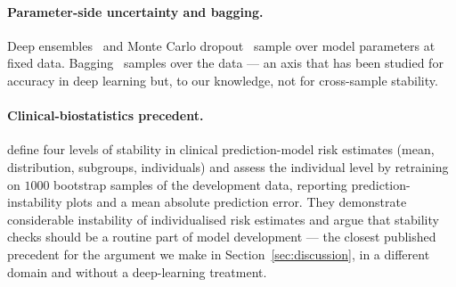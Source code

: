 \paragraph{Parameter-side uncertainty and bagging.}
Deep ensembles~\citep{lakshminarayanan2017simple} and Monte Carlo
dropout~\citep{gal2015dropout} sample over model parameters at fixed
data.  Bagging~\citep{Breiman1996} samples over the data --- an axis
that has been studied for accuracy in deep learning but, to our knowledge, not for
cross-sample stability.

\paragraph{Clinical-biostatistics precedent.}
\citet{Riley2023} define four levels of stability in clinical
prediction-model risk estimates (mean, distribution, subgroups,
individuals) and assess the individual level by retraining on
$1000$ bootstrap samples of the development data, reporting
prediction-instability plots and a mean absolute prediction error.
They demonstrate considerable instability of individualised risk
estimates and argue that stability checks should be a routine part
of model development --- the closest published precedent for the
argument we make in Section~\ref{sec:discussion}, in a different
domain and without a deep-learning treatment.


